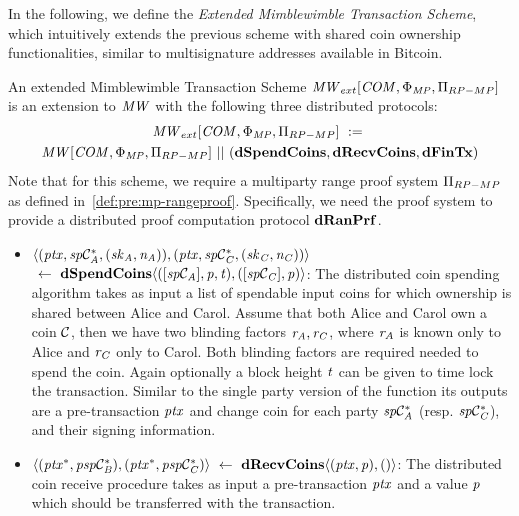 In the following, we define the \emph{Extended Mimblewimble Transaction Scheme}, which intuitively extends the previous scheme with shared coin ownership functionalities, similar to multisignature addresses available in Bitcoin.

\begin{definition}
    \label{def:atom:ext-mw-tx-scheme}
    An extended Mimblewimble Transaction Scheme $\mathit{MW}_{ext}[\mathit{COM},\Phi_{\mathit{MP}},\Pi_{RP-MP}]$ is an extension to $\mathit{MW}$ with the following three distributed protocols:
    \begin{gather*}
        \mathit{MW}_{ext}[\mathit{COM},\Phi_{\mathit{MP}},\Pi_{RP-MP}] ~:=~ \\ \mathit{MW}[\mathit{COM},\Phi_{\mathit{MP}},\Pi_{RP-MP}] ~||~ (\mathbf{dSpendCoins},\mathbf{dRecvCoins}, \mathbf{dFinTx})
    \end{gather*}
    Note that for this scheme, we require a multiparty range proof system $\Pi_{RP-MP}$ as defined in~\cref{def:pre:mp-rangeproof}.
    Specifically, we need the proof system to provide a distributed proof computation protocol $\mathbf{dRanPrf}$.
    \begin{itemize}
        \item $\langle (\mathit{ptx}, \mathit{sp}\mathcal{C}_{\mathit{A}}^*, (\mathit{sk}_{\mathit{A}},\mathit{\mathit{n}_{\mathit{A}}})), (\mathit{ptx}, \mathit{sp}\mathcal{C}_{\mathit{C}}^*, (\mathit{sk}_{\mathit{C}},\mathit{\mathit{n}_{\mathit{C}}})) \rangle$ \\
        $~\leftarrow~ \mathbf{dSpendCoins} \langle ([\mathit{sp}\mathcal{C}_{\mathit{A}}],\mathit{p},\mathit{t}), ([\mathit{sp}\mathcal{C}_{\mathit{C}}],\mathit{p}) \rangle$:
        The distributed coin spending algorithm takes as input a list of spendable input coins for which ownership is shared between Alice and Carol.
        Assume that both Alice and Carol own a coin $\mathcal{C}$, then we have two blinding factors $\mathit{r}_{\mathit{A}}, \mathit{r}_{\mathit{C}}$, where $\mathit{r}_{\mathit{A}}$ is known only to Alice and $\mathit{r}_{\mathit{C}}$ only to Carol.
        Both blinding factors are required needed to spend the coin.
        Again optionally a block height $\mathit{t}$ can be given to time lock the transaction.
        Similar to the single party version of the function its outputs are a pre-transaction $\mathit{ptx}$ and change coin for each party $\mathit{sp}\mathcal{C}_{\mathit{A}}^*$ (resp. $\mathit{sp}\mathcal{C}_{\mathit{C}}^*$), and their signing information.
        \item $\langle (\mathit{ptx}^*, \mathit{psp}\mathcal{C}_{\mathit{B}}^*), (\mathit{ptx}^*, \mathit{psp}\mathcal{C}_{\mathit{C}}^*) \rangle ~\leftarrow~ \mathbf{dRecvCoins} \langle(\mathit{ptx},\mathit{p}), () \rangle$: The distributed coin receive procedure takes as input a pre-transaction $\mathit{ptx}$ and a value $\mathit{p}$ which should be transferred with the transaction.

\end{itemize}
\end{definition}
